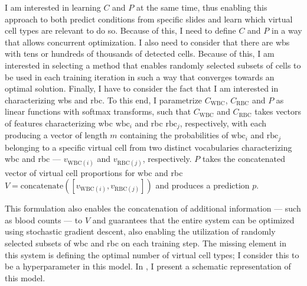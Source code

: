I am interested in learning $C$ and $P$ at the same time, thus enabling this approach to both predict conditions from specific slides and learn which virtual cell types are relevant to do so. Because of this, I need to define $C$ and $P$ in a way that allows concurrent optimization. I also need to consider that there are \ac{wbs} with tens or hundreds of thousands of detected  cells. Because of this, I am interested in selecting a method that enables randomly selected subsets of cells to be used in each training iteration in such a way that converges towards an optimal solution.  Finally, I have to consider the fact that I am interested in characterizing \ac{wbs} and \ac{rbc}. To this end, I parametrize $C_{\mathrm{WBC}}$, $C_{\mathrm{RBC}}$ and $P$ as linear functions with softmax transforms, such that $C_{\mathrm{WBC}}$ and $C_{\mathrm{RBC}}$ takes vectors of features characterizing \ac{wbc} $\mathrm{wbc}_i$ and \ac{rbc} $\mathrm{rbc}_j$, respectively, with each producing a vector of length $m$ containing the probabilities of $\mathrm{wbc}_i$ and $\mathrm{rbc}_j$ belonging to a specific virtual cell from two distinct vocabularies characterizing \ac{wbc} and \ac{rbc} --- $v_{\mathrm{WBC}(i)}$ and $v_{\mathrm{RBC}(j)}$, respectively. $P$ takes the concatenated vector of virtual cell proportions for \ac{wbc} and \ac{rbc} $V=\mathrm{concatenate}([v_{\mathrm{WBC}(i)},v_{\mathrm{RBC}(j)}])$ and produces a prediction $p$. 

This formulation also enables the concatenation of additional information --- such as blood counts --- to $V$ and guarantees that the entire system can be optimized using stochastic gradient descent, also enabling the utilization of randomly selected subsets of \ac{wbc} and \ac{rbc} on each training step. The missing element in this system is defining the optimal number of virtual cell types; I consider this to be a hyperparameter in this model. In , I present a schematic representation of this model.

\begin{figure}[!ht]
    \label{fig:mile-vice-schematic}
\end{figure}

